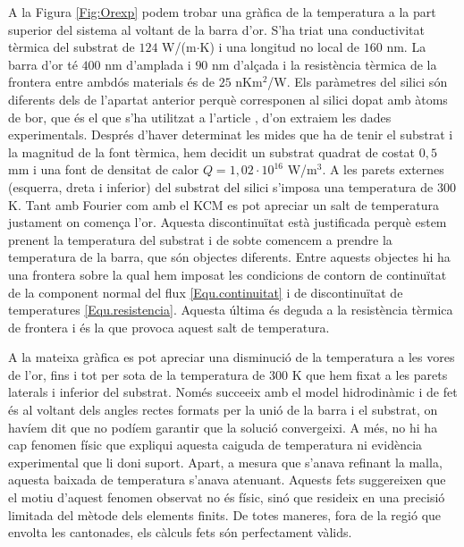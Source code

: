 \documentclass{article}
\begin{document}
A la Figura \ref{Fig:Orexp} podem trobar una gr\`{a}fica de la temperatura a la part superior del sistema al voltant de la barra d'or. S'ha triat una conductivitat t\`{e}rmica del substrat de $124 $ W/(m$\cdot$K) i una longitud no local de $160$ nm. La barra d'or t\'{e} $400$ nm d'amplada i $90$ nm d'al\c{c}ada i la resist\`{e}ncia t\`{e}rmica de la frontera entre ambd\'{o}s materials \'{e}s de $25$ nKm$^2$/W. Els par\`{a}metres del silici s\'{o}n diferents dels de l'apartat anterior perqu\`{e} corresponen al silici dopat amb \`{a}toms de bor, que \'{e}s el que s'ha utilitzat a l'article \cite{torres2018emergence}, d'on extraiem les dades experimentals. Despr\'{e}s d'haver determinat les mides que ha de tenir el substrat i la magnitud de la font t\`{e}rmica, hem decidit un substrat quadrat de costat $0,5$ mm i una font de densitat de calor $Q=1,02\cdot10^{16}$ W/m$^3$. A les parets externes (esquerra, dreta i inferior) del substrat del silici s'imposa una temperatura de $300$ K. Tant amb Fourier com amb el KCM es pot apreciar un salt de temperatura justament on comen\c{c}a l'or. Aquesta discontinu\"{i}tat est\`{a} justificada perqu\`{e} estem prenent la temperatura del substrat i de sobte comencem a prendre la temperatura de la barra, que s\'{o}n objectes diferents. Entre aquests objectes hi ha una frontera sobre la qual hem imposat les condicions de contorn de continu\"{i}tat de la component normal del flux \eqref{Equ.continuitat} i de discontinu\"{i}tat de temperatures \eqref{Equ.resistencia}. Aquesta \'{u}ltima \'{e}s deguda a la resist\`{e}ncia t\`{e}rmica de frontera i \'{e}s la que provoca aquest salt  de temperatura.

A la mateixa gr\`{a}fica es pot apreciar una disminuci\'{o} de la temperatura a les vores de l'or, fins i tot per sota de la temperatura de 300 K que hem fixat a les parets laterals i inferior del substrat. Nom\'{e}s succeeix amb el model hidrodin\`{a}mic i de fet \'{e}s al voltant dels angles rectes formats per la uni\'{o} de la barra i el substrat, on hav\'{i}em dit que no pod\'{i}em garantir que la soluci\'{o} convergeixi. A m\'{e}s, no hi ha cap fenomen f\'{i}sic que expliqui aquesta caiguda de temperatura ni evid\`{e}ncia experimental que li doni suport. Apart, a mesura que s'anava refinant la malla, aquesta baixada de temperatura s'anava atenuant. Aquests fets suggereixen que el motiu d'aquest fenomen observat no \'{e}s f\'{i}sic, sin\'{o} que resideix en una precisi\'{o} limitada del m\`{e}tode dels elements finits. De totes maneres, fora de la regi\'{o} que envolta les cantonades, els c\`{a}lculs fets s\'{o}n perfectament v\`{a}lids.
\end{document}
